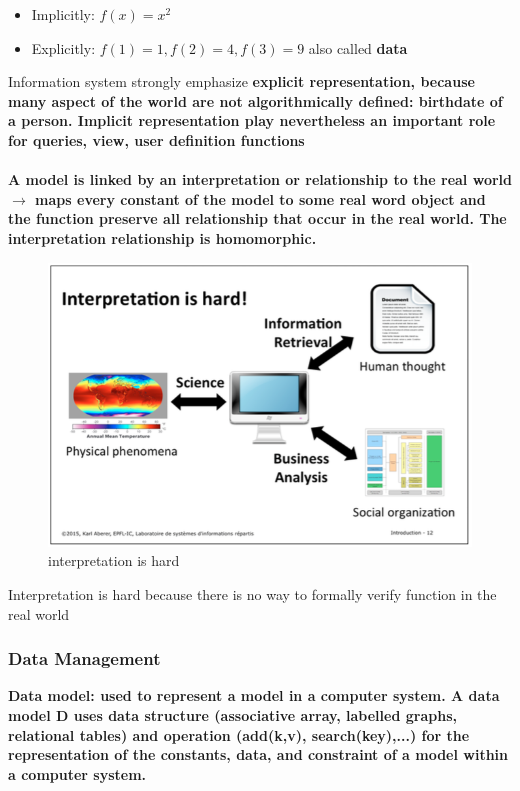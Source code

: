 \begin{itemize}
\item Implicitly: $f(x) = x^2$
\item Explicitly: $f(1) = 1, f(2) = 4, f(3) = 9$ also called \bf{data}
\end{itemize}
Information system strongly emphasize \bf{explicit} representation, because many aspect of the world are not algorithmically defined: birthdate of a person. \bf{Implicit} representation play nevertheless an important role for queries, view, user definition functions
\\
\\
A model is linked by an \bf{interpretation or relationship} to the real world $\rightarrow$ maps every constant of the model to some real word object and the function preserve all relationship that occur in the real world. The interpretation relationship is \bf{homomorphic}. 

\begin{figure}[!ht]
\begin{center}
\includegraphics[width=1\linewidth]{figures/interpretation_hard.png}
\end{center}
\caption{interpretation is hard}
\end{figure}

Interpretation is hard because there is no way to formally verify function in the real world

\subsubsection{Data Management}
 \bf{Data model}: used to represent a model in a computer system. A data model D uses \bf{data structure} (associative array, labelled graphs, relational tables) and \bf{operation} (add(k,v), search(key),...) for the representation of the constants, data, and constraint of a model within a computer system.
 
